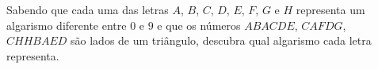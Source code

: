 Sabendo que cada uma das letras $A$, $B$, $C$, $D$, $E$, $F$, $G$ e $H$ representa um algarismo diferente entre $0$ e $9$ e que os números $ABACDE$, $CAFDG$, $CHHBAED$ são lados de um triângulo, descubra qual algarismo cada letra representa.
